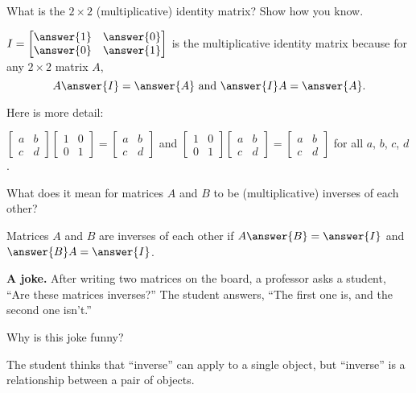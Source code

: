 \documentclass[space,nooutcomes]{ximera}
\begin{document}
\begin{question}
What is the $2\times 2$ (multiplicative) identity matrix?  Show how you know.
\begin{solution}
$I = \begin{bmatrix} \answer{1}&\answer{0} \\ \answer{0}&\answer{1} \end{bmatrix}$ is the multiplicative identity matrix because for any $2\times 2$ matrix $A$, 
\[
A\answer{I} = \answer{A}\text{ and }\answer{I}A=\answer{A}.  
\]
\begin{feedback}[correct]
Here is more detail:  

$\begin{bmatrix} a&b \\ c&d \end{bmatrix}  \begin{bmatrix} 1&0 \\ 0&1 \end{bmatrix} = 
\begin{bmatrix} a&b \\ c&d \end{bmatrix}$  
and
$\begin{bmatrix} 1&0 \\ 0&1 \end{bmatrix} \begin{bmatrix} a&b \\ c&d \end{bmatrix} = 
\begin{bmatrix} a&b \\ c&d \end{bmatrix}$  for all $a$, $b$, $c$, $d$.  
\end{feedback}
\end{solution}
\end{question}

\begin{question}
What does it mean for matrices $A$ and $B$ to be (multiplicative) inverses of each other?  

\begin{solution}
Matrices $A$ and $B$ are inverses of each other if $A\answer{B}=\answer{I}$ and $\answer{B}A=\answer{I}$.  
\end{solution}
\end{question}

\textbf{A joke.}  After writing two matrices on the board, a professor asks a student, ``Are these matrices inverses?''  The student answers, ``The first one is, and the second one isn't.''  
\begin{question}
Why is this joke funny?  
\begin{freeResponse}
\begin{hint}
The student thinks that ``inverse'' can apply to a single object, but ``inverse'' is a relationship between a pair of objects.  
\end{hint}
\end{freeResponse}
\end{question}
\end{document}
